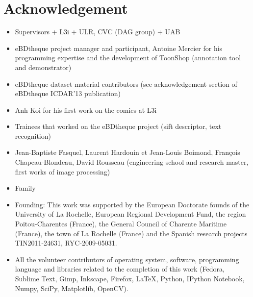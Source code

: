 \chapter*{Acknowledgement}
\begin{itemize}
	\item Supervisors + L3i + ULR, CVC (DAG group) + UAB
	\item eBDtheque project manager and participant, Antoine Mercier for his programming expertise and the development of ToonShop (annotation tool and demonstrator)
	\item eBDtheque dataset material contributors (see acknowledgement section of eBDtheque ICDAR'13 publication)
	\item Anh Koi for his first work on the comics at L3i
	\item Trainees that worked on the eBDtheque project (sift descriptor, text recognition)
	\item Jean-Baptiste Fasquel, Laurent Hardouin et Jean-Louis Boimond, François Chapeau-Blondeau, David Rousseau (engineering school and research master, first works of image processing)
	\item Family
	\item Founding: This work was supported by the European Doctorate founds of the  University of La Rochelle, European Regional Development Fund, the region Poitou-Charentes (France), the General Council of Charente Maritime (France), the town of La Rochelle (France) and the Spanish research projects TIN2011-24631, RYC-2009-05031.
	\item All the volunteer contributors of operating system, software, programming language and libraries related to the completion of this work (Fedora, Sublime Text, Gimp, Inkscape, Firefox, \LaTeX, Python, IPython Notebook, Numpy, SciPy, Matplotlib, OpenCV).
\end{itemize}
\clearpage\thispagestyle{empty}